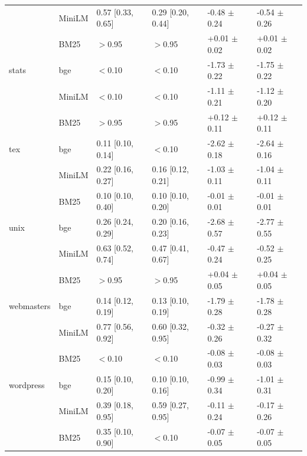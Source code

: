 \begin{tabular}{llllll}
 & MiniLM & 0.57 [0.33, 0.65] & 0.29 [0.20, 0.44] & -0.48 $\pm$ 0.24 & -0.54 $\pm$ 0.26\\
 & BM25 & $>$0.95 & $>$0.95 & +0.01 $\pm$ 0.02 & +0.01 $\pm$ 0.02\\
\addlinespace[1pt]
stats & bge & $<$0.10 & $<$0.10 & -1.73 $\pm$ 0.22 & -1.75 $\pm$ 0.22\\
 & MiniLM & $<$0.10 & $<$0.10 & -1.11 $\pm$ 0.21 & -1.12 $\pm$ 0.20\\
 & BM25 & $>$0.95 & $>$0.95 & +0.12 $\pm$ 0.11 & +0.12 $\pm$ 0.11\\
\addlinespace[1pt]
tex & bge & 0.11 [0.10, 0.14] & $<$0.10 & -2.62 $\pm$ 0.18 & -2.64 $\pm$ 0.16\\
 & MiniLM & 0.22 [0.16, 0.27] & 0.16 [0.12, 0.21] & -1.03 $\pm$ 0.11 & -1.04 $\pm$ 0.11\\
 & BM25 & 0.10 [0.10, 0.40] & 0.10 [0.10, 0.20] & -0.01 $\pm$ 0.01 & -0.01 $\pm$ 0.01\\
\addlinespace[1pt]
unix & bge & 0.26 [0.24, 0.29] & 0.20 [0.16, 0.23] & -2.68 $\pm$ 0.57 & -2.77 $\pm$ 0.55\\
 & MiniLM & 0.63 [0.52, 0.74] & 0.47 [0.41, 0.67] & -0.47 $\pm$ 0.24 & -0.52 $\pm$ 0.25\\
 & BM25 & $>$0.95 & $>$0.95 & +0.04 $\pm$ 0.05 & +0.04 $\pm$ 0.05\\
\addlinespace[1pt]
webmasters & bge & 0.14 [0.12, 0.19] & 0.13 [0.10, 0.19] & -1.79 $\pm$ 0.28 & -1.78 $\pm$ 0.28\\
 & MiniLM & 0.77 [0.56, 0.92] & 0.60 [0.32, 0.95] & -0.32 $\pm$ 0.26 & -0.27 $\pm$ 0.32\\
 & BM25 & $<$0.10 & $<$0.10 & -0.08 $\pm$ 0.03 & -0.08 $\pm$ 0.03\\
\addlinespace[1pt]
wordpress & bge & 0.15 [0.10, 0.20] & 0.10 [0.10, 0.16] & -0.99 $\pm$ 0.34 & -1.01 $\pm$ 0.31\\
 & MiniLM & 0.39 [0.18, 0.95] & 0.59 [0.27, 0.95] & -0.11 $\pm$ 0.24 & -0.17 $\pm$ 0.26\\
 & BM25 & 0.35 [0.10, 0.90] & $<$0.10 & -0.07 $\pm$ 0.05 & -0.07 $\pm$ 0.05\\
\bottomrule\end{tabular}